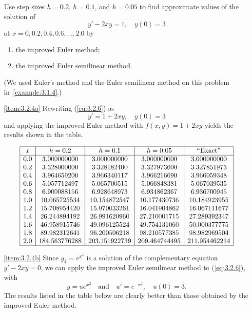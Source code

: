 \documentclass{ximera}
\begin{document}
\begin{example}\label{example:3.2.4}
Use step sizes $h=0.2$, $h=0.1$, and $h=0.05$ to find approximate
values of the solution of
\begin{equation} \label{eq:3.2.6}
y'-2xy=1,\quad y(0)=3
\end{equation}
at $x=0, 0.2, 0.4, 0.6, \dots, 2.0$ by
\begin{enumerate}
\item\label{item:3.2.4a}
the improved Euler method;
\item\label{item:3.2.4b}
the improved Euler
semilinear method. 
\end{enumerate}
(We used Euler's method and the Euler semilinear
method on this problem in~\ref{example:3.1.4}.)

\begin{explanation}
\ref{item:3.2.4a}
Rewriting (\ref{eq:3.2.6}) as
$$
y'=1+2xy,\quad y(0)=3
$$
and applying the improved Euler method with $f(x,y)=1+2xy$ yields
the results shown in the table.

$$
\begin{array}{|c|c|c|c|c|}
\hline
x&
h=0.2&
h=0.1&
h=0.05&
\text{``Exact''}\\ \hline
0.0 &   3.000000000 &   3.000000000 &   3.000000000 &   3.000000000 \\
0.2 &   3.328000000 &   3.328182400 &   3.327973600 &   3.327851973 \\
0.4 &   3.964659200 &   3.966340117 &   3.966216690 &   3.966059348 \\
0.6 &   5.057712497 &   5.065700515 &   5.066848381 &   5.067039535 \\
0.8 &   6.900088156 &   6.928648973 &   6.934862367 &   6.936700945 \\
1.0 &  10.065725534 &  10.154872547 &  10.177430736 &  10.184923955 \\
1.2 &  15.708954420 &  15.970033261 &  16.041904862 &  16.067111677 \\
1.4 &  26.244894192 &  26.991620960 &  27.210001715 &  27.289392347 \\
1.6 &  46.958915746 &  49.096125524 &  49.754131060 &  50.000377775 \\
1.8 &  89.982312641 &  96.200506218 &  98.210577385 &  98.982969504 \\
2.0 & 184.563776288 & 203.151922739 & 209.464744495 & 211.954462214 \\
\hline
\end{array}
$$

\ref{item:3.2.4b}
Since $y_1=e^{x^2}$ is a solution of the complementary equation
$y'-2xy=0$, we can  apply the improved Euler semilinear method to
(\ref{eq:3.2.6}), with
$$
y=ue^{x^2}\quad\mbox{and}\quad
u'=e^{-x^2},\quad u(0)=3.
$$
The results listed in the table below are clearly better than
those obtained by the improved Euler method.



\end{explanation}
\end{example}
\end{document}
